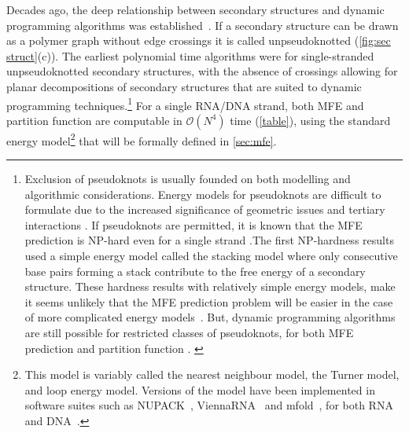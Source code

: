 \documentclass[11pt,letterpaper]{article}  \usepackage[margin=1in]{geometry}
\theoremstyle{definition}  \newtheorem{Definition}[theorem]{Definition}
\begin{document}
Decades ago, the deep relationship between secondary structures and dynamic programming algorithms was established~\cite{zukeroptimal,zukerrna, nussinov1978algorithms, nussinov1980fast,waterman1986rapid, mccaskill1990equilibrium}.  
If a secondary structure can be drawn as a polymer graph  without edge crossings it is called unpseudoknotted  (\cref{fig:sec struct}(c)).
The earliest polynomial time algorithms were for single-stranded  unpseudoknotted secondary structures, with the absence of crossings allowing for planar decompositions of secondary structures that are suited  to dynamic programming techniques.\footnote{Exclusion of pseudoknots is usually founded on both modelling and algorithmic considerations. Energy models for pseudoknots are difficult to formulate due to the increased significance of geometric issues and tertiary interactions \cite{dirks2007thermodynamic}. If pseudoknots are permitted, it is known that the MFE prediction is NP-hard even for a single strand \cite{akutsu2000dynamic,lyngso2000pseudoknots,lyngso2000rna}.The first NP-hardness results \cite{akutsu2000dynamic,lyngso2000pseudoknots} used a simple energy model called the stacking model where only consecutive base pairs forming a stack contribute to the free energy of a secondary structure. These hardness results with relatively simple energy models, make it seems unlikely that the MFE prediction problem will be easier in the case of more complicated energy models~\cite{condon2021predicting}. But, dynamic programming algorithms are still possible for restricted classes of pseudoknots, for both MFE prediction \cite{rivas1999dynamic, uemura1999tree, chen2009n, jabbari2018knotty, reeder2004design} and partition function \cite{dirks2003partition, dirks2004algorithm}. \label{ft:pseudoknot}}  
For a single RNA/DNA strand, both MFE and partition function are computable in $\mathcal{O}(N^4)$ time (\cref{table}),  using the standard  energy model\footnote{This model is variably called the nearest neighbour model, the Turner model, and loop energy model. 
Versions of the model have been implemented in software suites such as NUPACK~\cite{dirks2007thermodynamic,dirks2004algorithm,fornace2020unified}, ViennaRNA~\cite{viennaRNA} and mfold~\cite{mfold}, for both RNA and DNA~\cite{santalucia1998unified,santa}.} that will be formally defined in \cref{sec:mfe}. 
\end{document}
